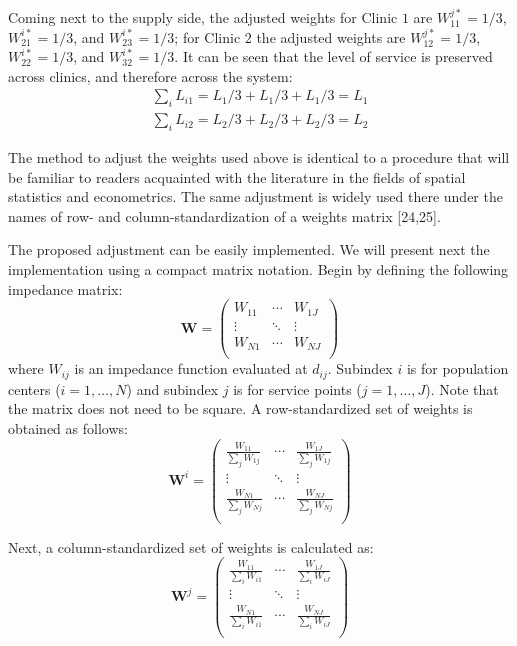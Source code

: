 \documentclass[10pt,letterpaper]{article}
\begin{document}
Coming next to the supply side, the adjusted weights for Clinic \(1\)
are \(W^{j*}_{11} = 1/3\), \(W^{i*}_{21} = 1/3\), and
\(W^{i*}_{23} = 1/3\); for Clinic \(2\) the adjusted weights are
\(W^{j*}_{12} = 1/3\), \(W^{i*}_{22} = 1/3\), and \(W^{i*}_{32} = 1/3\).
It can be seen that the level of service is preserved across clinics,
and therefore across the system: \[
\begin{array}{ll}
            \sum_i L_{i1} = L_{1}/3 + L_{1}/3 + L_{1}/3 = L_1\\
            \sum_i L_{i2} = L_{2}/3 + L_{2}/3 + L_{2}/3 = L_2
        \end{array}
\]

The method to adjust the weights used above is identical to a procedure
that will be familiar to readers acquainted with the literature in the
fields of spatial statistics and econometrics. The same adjustment is
widely used there under the names of row- and column-standardization of
a weights matrix {[}24,25{]}.

The proposed adjustment can be easily implemented. We will present next
the implementation using a compact matrix notation. Begin by defining
the following impedance matrix: \[
\mathbf{W} = \left(\begin{array}{ccc}
            W_{11} & \cdots & W_{1J}\\
            \vdots & \ddots & \vdots\\
            W_{N1} & \cdots & W_{NJ}\\
        \end{array}
        \right)
\] where \(W_{ij}\) is an impedance function evaluated at \(d_{ij}\).
Subindex \(i\) is for population centers (\(i=1,\dots,N\)) and subindex
\(j\) is for service points (\(j=1,\dots,J\)). Note that the matrix does
not need to be square. A row-standardized set of weights is obtained as
follows: \[
\mathbf{W}^{i} = \left(\begin{array}{ccc}
            \frac{W_{11}}{\sum_jW_{1j}} & \cdots & \frac{W_{1J}}{\sum_jW_{1j}}\\
            \vdots & \ddots & \vdots\\
            \frac{W_{N1}}{\sum_jW_{Nj}} & \cdots & \frac{W_{NJ}}{\sum_jW_{Nj}}\\
        \end{array}
        \right)
\]

Next, a column-standardized set of weights is calculated as: \[
\mathbf{W}^{j} = \left(\begin{array}{ccc}
            \frac{W_{11}}{\sum_iW_{i1}} & \cdots & \frac{W_{1J}}{\sum_iW_{iJ}}\\
            \vdots & \ddots & \vdots\\
            \frac{W_{N1}}{\sum_iW_{i1}} & \cdots & \frac{W_{NJ}}{\sum_iW_{iJ}}\\
        \end{array}
        \right)
\]
\end{document}
